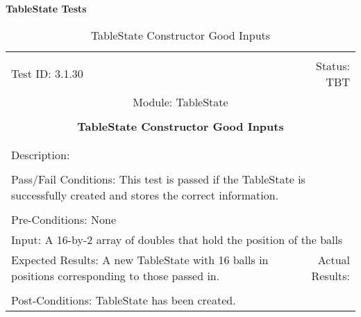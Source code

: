 \documentclass[titlepage]{article}
\begin{document}
\large{\textbf{TableState Tests}}
\begin{center}%
\begin{table}
\begin{tabular}{|l r|}\hline&\\[-2mm]
	Test ID: 3.1.30	&Status: TBT\\[-3mm]
	\multicolumn{2}{|c|}{Module: TableState}\\&\\
	\multicolumn{2}{|c|}{\textbf{\large{TableState Constructor Good Inputs}}}\\&\\\hline&\\[-3mm]
	\multicolumn{2}{|p{\textwidth}|}{Description: }\\[1mm]\hline&\\[-3mm]
	\multicolumn{2}{|p{\textwidth}|}{Pass/Fail Conditions: This test is passed if the TableState is successfully created and stores the correct information.}\\[1mm]\hline&\\[-3mm]
	\multicolumn{2}{|p{\textwidth}|}{Pre-Conditions: None}\\[4mm]
	\multicolumn{2}{|p{\textwidth}|}{Input: A 16-by-2 array of doubles that hold the position of the balls}\\[2mm]\hline
	\multicolumn{1}{|p{0.49\textwidth}}{Expected Results: A new TableState with 16 balls in positions corresponding to those passed in.}	&\multicolumn{1}{|p{0.45\textwidth}|}{Actual Results: }\\\hline&\\[-3mm]
	\multicolumn{2}{|p{\textwidth}|}{Post-Conditions: TableState has been created.}\\\hline
\end{tabular}
\caption{TableState Constructor Good Inputs}
\end{table}
\end{center}
\end{document}
